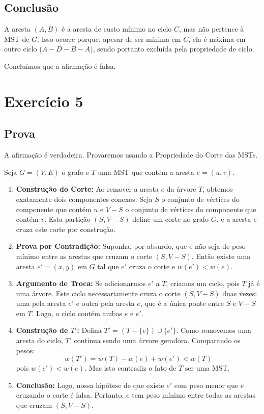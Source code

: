 \documentclass[a4paper,12pt]{article}
\begin{document}
\subsection*{Conclusão}
A aresta $(A, B)$ é a aresta de custo mínimo no ciclo $C$, mas não pertence à MST de $G$. Isso ocorre porque, apesar de ser mínima em $C$, ela é máxima em outro ciclo ($A-D-B-A$), sendo portanto excluída pela propriedade de ciclo.

Concluímos que a afirmação é falsa.

\newpage

\section*{Exercício 5}

\subsection*{Prova}
A afirmação é verdadeira. Provaremos usando a Propriedade do Corte das MSTs.

Seja $G = (V, E)$ o grafo e $T$ uma MST que contém a aresta $e = (u, v)$.

\begin{enumerate}
    \item \textbf{Construção do Corte:}
    Ao remover a aresta $e$ da árvore $T$, obtemos exatamente dois componentes conexos. Seja $S$ o conjunto de vértices do componente que contém $u$ e $V-S$ o conjunto de vértices do componente que contém $v$. Esta partição $(S, V-S)$ define um corte no grafo $G$, e a aresta $e$ cruza este corte por construção.
    
    \item \textbf{Prova por Contradição:}
    Suponha, por absurdo, que $e$ não seja de peso mínimo entre as arestas que cruzam o corte $(S, V-S)$. Então existe uma aresta $e' = (x, y)$ em $G$ tal que $e'$ cruza o corte e $w(e') < w(e)$.

    \item \textbf{Argumento de Troca:}
    Se adicionarmos $e'$ a $T$, criamos um ciclo, pois $T$ já é uma árvore. Este ciclo necessariamente cruza o corte $(S, V-S)$ duas vezes: uma pela aresta $e'$ e outra pela aresta $e$, que é a única ponte entre $S$ e $V-S$ em $T$. Logo, o ciclo contém ambas $e$ e $e'$.
    
    \item \textbf{Construção de $T'$:}
    Defina $T' = (T - \{e\}) \cup \{e'\}$. Como removemos uma aresta do ciclo, $T'$ continua sendo uma árvore geradora. Comparando os pesos:
    $$ w(T') = w(T) - w(e) + w(e') < w(T) $$
    pois $w(e') < w(e)$. Mas isto contradiz o fato de $T$ ser uma MST.

    \item \textbf{Conclusão:}
    Logo, nossa hipótese de que existe $e'$ com peso menor que $e$ cruzando o corte é falsa. Portanto, $e$ tem peso mínimo entre todas as arestas que cruzam $(S, V-S)$.
\end{enumerate}
\end{document}
